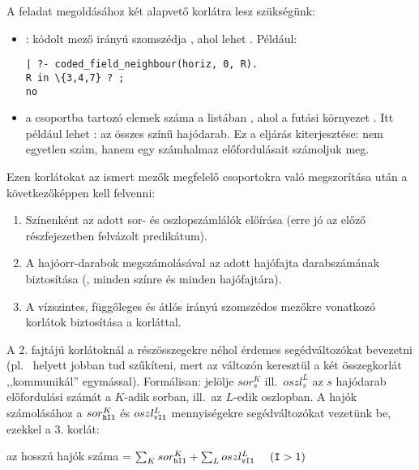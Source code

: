 A feladat megoldásához két alapvető korlátra lesz szükségünk:

\begin{itemize}
\item {}:  kódolt mező
 irányú szomszédja , ahol  lehet . Például:

\begin{verbatim}
| ?- coded_field_neighbour(horiz, 0, R).
R in \{3,4,7} ? ;
no
\end{verbatim}

\item {} a  csoportba
tartozó elemek száma a  listában , ahol a futási
környezet . Itt  például lehet : az összes
 színű hajódarab. Ez a  eljárás kiterjesztése: nem
egyetlen szám, hanem egy számhalmaz előfordulásait számoljuk meg.
\end{itemize}

Ezen korlátokat az ismert mezők megfelelő csoportokra való megszorítása
után a következőképpen kell felvenni:

\begin{enumerate}
\item Színenként az adott sor- és oszlopszámlálók előírása (erre jó az
előző részfejezetben felvázolt  predikátum).
\item A hajóorr-darabok megszámolásával az adott hajófajta darabszámának
biztosítása (, minden színre és minden hajófajtára).
\item A vízszintes, függőleges és átlós irányú szomszédos mezőkre vonatkozó
korlátok biztosítása a  korláttal.
\end{enumerate}

A 2. fajtájú korlátoknál a részösszegekre néhol érdemes segédváltozókat
bevezetni (pl.\  helyett  jobban tud szűkíteni, mert az  változón keresztül a
két összegkorlát ,,kommunikál'' egymással). Formálisan: jelölje $sor^K_s$
ill.\ $oszl^L_s$ az $s$ hajódarab előfordulási számát a $K$-adik sorban,
ill.\ az $L$-edik oszlopban. A hajók számolásához a $sor^K_{\tt hI1}$ és
$oszl^L_{\tt vI1}$ mennyiségekre segédváltozókat vezetünk be, ezekkel a 3. korlát:

\begin{center}
az  hosszú hajók száma = 
$\sum_{K} sor^K_{\tt hI1} + \sum_{L} oszl^L_{\tt vI1} \ \ \ \ ({\tt I} > 1)$
\end{center}

